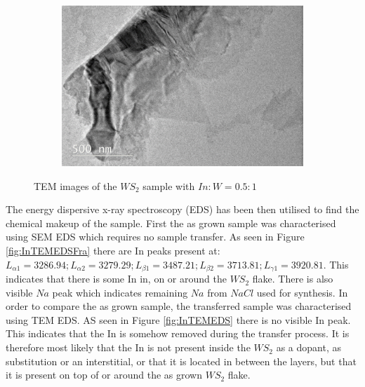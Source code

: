 \begin{figure}[H]
\begin{center}
		\begin{subfigure}[b]{0.6\textwidth}
			\includegraphics[width=\textwidth]{In/TEMImage3.png}
			\caption{}
			\label{fig:InTEMImage3}
		\end{subfigure}
		\caption{TEM images of the $WS_2$ sample with $In:W = 0.5:1$}
		\label{fig:InTEMImages}
	\end{center}
\end{figure}

The energy dispersive x-ray spectroscopy (EDS) has been then utilised to find the chemical makeup of the sample. First the as grown sample was characterised using SEM EDS which requires no sample transfer. As seen in Figure \ref{fig:InTEMEDSFra} there are In peaks present at: $L_{{\alpha}1} = 3286.94; L_{{\alpha}2} = 3279.29; L_{{\beta}1} = 3487.21; L_{{\beta}2} = 3713.81; L_{{\gamma}1} = 3920.81$. This indicates that there is some In in, on or around the $WS_2$ flake. There is also visible $Na$ peak which indicates remaining $Na$ from $NaCl$ used for synthesis. In order to compare the as grown sample, the transferred sample was characterised using TEM EDS. AS seen in Figure \ref{fig:InTEMEDS} there is no visible In peak. This indicates that the In is somehow removed during the transfer process. It is therefore most likely that the In is not present inside the $WS_2$ as a dopant, as substitution or an interstitial, or that it is located in between the layers, but that it is present on top of or around the as grown $WS_2$ flake.

